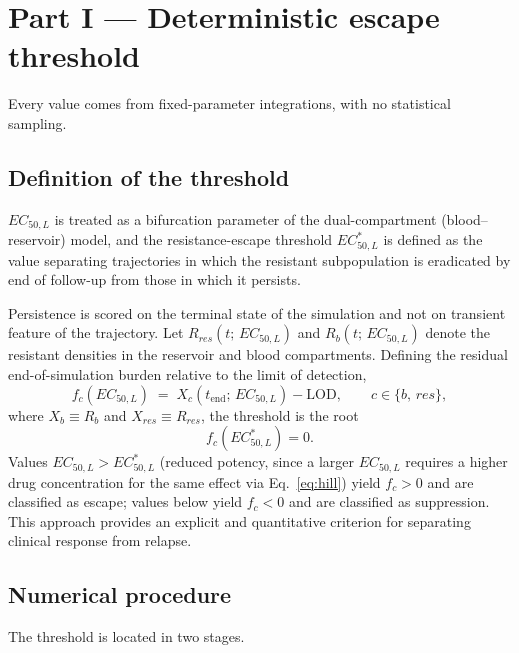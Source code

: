 \documentclass[11pt]{article}
\begin{document}
\section{Part I --- Deterministic escape threshold}
\label{sec:deterministic}

Every value comes from fixed-parameter integrations, with no statistical sampling.

\subsection{Definition of the threshold}

$EC_{50,L}$ is treated as a bifurcation parameter of the dual-compartment
(blood--reservoir) model, and the resistance-escape threshold
$EC_{50,L}^{*}$ is defined as the value separating trajectories in which
the resistant subpopulation is eradicated by end of follow-up from those in
which it persists.

Persistence is scored on the terminal state of the simulation and not
on transient feature of the trajectory. Let
$R_{res}(t;\,EC_{50,L})$ and $R_b(t;\,EC_{50,L})$ denote the resistant
densities in the reservoir and blood compartments. Defining the residual
end-of-simulation burden relative to the limit of detection,
\begin{equation}
  f_c(EC_{50,L}) \;=\; X_c\!\left(t_{\mathrm{end}};\,EC_{50,L}\right) - \mathrm{LOD},
  \qquad c \in \{b,\,res\},
  \label{eq:objective}
\end{equation}
where $X_b \equiv R_b$ and $X_{res} \equiv R_{res}$, the threshold is the
root
\begin{equation}
  f_c\!\left(EC_{50,L}^{*}\right) = 0 .
  \label{eq:root}
\end{equation}
Values $EC_{50,L} > EC_{50,L}^{*}$ (reduced potency, since a larger
$EC_{50,L}$ requires a higher drug concentration for the same effect via
Eq.~\eqref{eq:hill}) yield $f_c > 0$ and are classified as escape;
values below yield $f_c < 0$ and are classified as suppression. This approach provides an explicit and quantitative criterion for separating clinical response from relapse.

\subsection{Numerical procedure}

The threshold is located in two stages.
\end{document}

